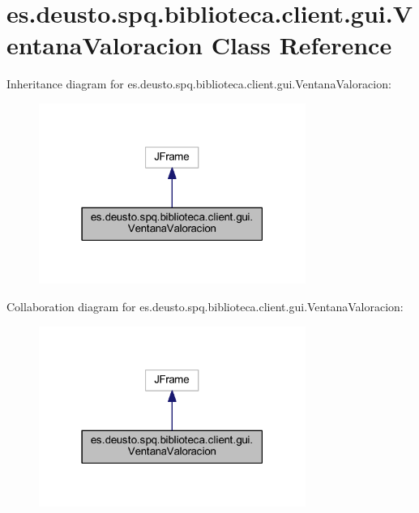 \hypertarget{classes_1_1deusto_1_1spq_1_1biblioteca_1_1client_1_1gui_1_1_ventana_valoracion}{}\section{es.\+deusto.\+spq.\+biblioteca.\+client.\+gui.\+Ventana\+Valoracion Class Reference}
\label{classes_1_1deusto_1_1spq_1_1biblioteca_1_1client_1_1gui_1_1_ventana_valoracion}


Inheritance diagram for es.\+deusto.\+spq.\+biblioteca.\+client.\+gui.\+Ventana\+Valoracion\+:
\nopagebreak
\begin{figure}[H]
\begin{center}
\leavevmode
\includegraphics[width=247pt]{classes_1_1deusto_1_1spq_1_1biblioteca_1_1client_1_1gui_1_1_ventana_valoracion__inherit__graph}
\end{center}
\end{figure}


Collaboration diagram for es.\+deusto.\+spq.\+biblioteca.\+client.\+gui.\+Ventana\+Valoracion\+:
\nopagebreak
\begin{figure}[H]
\begin{center}
\leavevmode
\includegraphics[width=247pt]{classes_1_1deusto_1_1spq_1_1biblioteca_1_1client_1_1gui_1_1_ventana_valoracion__coll__graph}
\end{center}
\end{figure}
